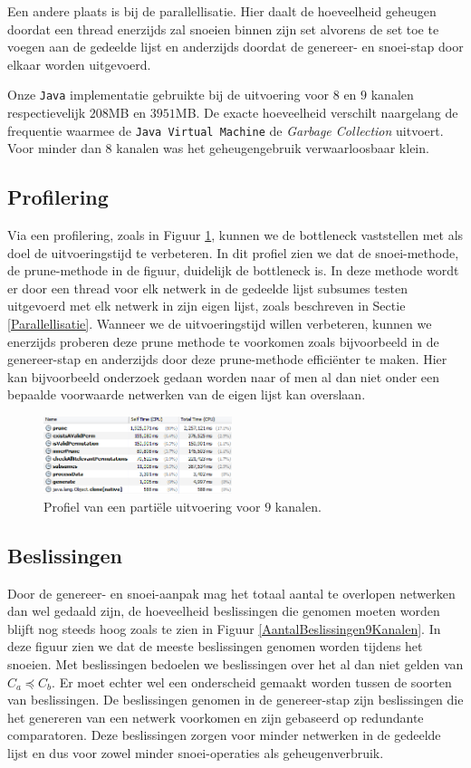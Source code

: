 \documentclass{article}
\begin{document}
Een andere plaats is bij de parallellisatie.
Hier daalt de hoeveelheid geheugen doordat een thread enerzijds zal snoeien binnen zijn set alvorens de set toe te voegen aan de gedeelde lijst en anderzijds doordat de genereer- en snoei-stap door elkaar worden uitgevoerd.

Onze \texttt{Java} implementatie gebruikte bij de uitvoering voor $8$ en $9$ kanalen respectievelijk $208$MB en $3951$MB.
De exacte hoeveelheid verschilt naargelang de frequentie waarmee de \texttt{Java Virtual Machine} de \textit{Garbage Collection} uitvoert.
Voor minder dan $8$ kanalen was het geheugengebruik verwaarloosbaar klein.

\subsection{Profilering}\label{Profilering}
Via een profilering, zoals in Figuur \ref{ProfileTime9}, kunnen we de bottleneck vaststellen met als doel de uitvoeringstijd te verbeteren.
In dit profiel zien we dat de snoei-methode, de prune-methode in de figuur, duidelijk de bottleneck is.
In deze methode wordt er door een thread voor elk netwerk in de gedeelde lijst subsumes testen uitgevoerd met elk netwerk in zijn eigen lijst, zoals beschreven in Sectie \ref{Parallellisatie}.
Wanneer we de uitvoeringstijd willen verbeteren, kunnen we enerzijds proberen deze prune methode te voorkomen zoals bijvoorbeeld in de genereer-stap en anderzijds door deze prune-methode effici\"enter te maken.
Hier kan bijvoorbeeld onderzoek gedaan worden naar of men al dan niet onder een bepaalde voorwaarde netwerken van de eigen lijst kan overslaan.
\begin{figure}[!h]
\centering
\vspace{10pt}
\includegraphics[width=0.49\textwidth]{Profile_Time_9.png}
\caption{Profiel van een parti\"ele uitvoering voor $9$ kanalen.}
\label{ProfileTime9}
\end{figure}

\subsection{Beslissingen}
Door de genereer- en snoei-aanpak mag het totaal aantal te overlopen netwerken dan wel gedaald zijn, de hoeveelheid beslissingen die genomen moeten worden blijft nog steeds hoog zoals te zien in Figuur \ref{AantalBeslissingen9Kanalen}.
In deze figuur zien we dat de meeste beslissingen genomen worden tijdens het snoeien.
Met beslissingen bedoelen we beslissingen over het al dan niet gelden van $C_a \preceq C_b$.
Er moet echter wel een onderscheid gemaakt worden tussen de soorten van beslissingen.
De beslissingen genomen in de genereer-stap zijn beslissingen die het genereren van een netwerk voorkomen en zijn gebaseerd op redundante comparatoren.
Deze beslissingen zorgen voor minder netwerken in de gedeelde lijst en dus voor zowel minder snoei-operaties als geheugenverbruik.
\end{document}
